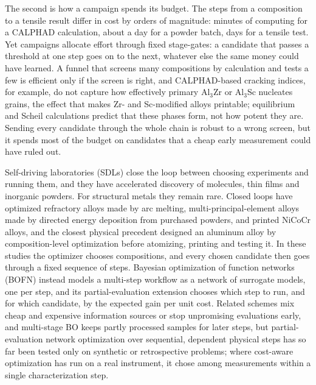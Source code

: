 \documentclass[11pt]{article}
\begin{document}
The second is how a campaign spends its budget. The steps from a composition
to a tensile result differ in cost by orders of magnitude: minutes of computing
for a CALPHAD calculation, about a day for a powder batch, days for a tensile
test. Yet campaigns allocate effort through fixed stage-gates: a candidate that
passes a threshold at one step goes on to the next, whatever else the same
money could have learned. A funnel that screens many
compositions by calculation and tests a few is efficient only if the screen is
right, and CALPHAD-based cracking indices, for example, do not capture how
effectively primary Al$_3$Zr or Al$_3$Sc nucleates grains, the effect that
makes Zr- and Sc-modified alloys printable; equilibrium and Scheil calculations
predict that these phases form, not how potent they are.\cite{kou2015,martin2017,croteau2018} Sending every candidate
through the whole chain is robust to a wrong screen, but it spends most of the
budget on candidates that a cheap early measurement could have ruled out.

Self-driving laboratories (SDLs) close the loop between choosing experiments
and running them, and they have accelerated discovery of molecules, thin films
and inorganic powders.\cite{tom2024,abolhasani2023,stach2021,tobias2025,burger2020,macleod2020,kusne2020,szymanski2023}
For structural metals they remain rare. Closed loops have optimized refractory
alloys made by arc melting,\cite{paramore2025} multi-principal-element alloys
made by directed energy deposition from purchased powders,\cite{nelaturu2024}
and printed NiCoCr alloys,\cite{talbot2026} and the closest physical
precedent designed an aluminum alloy by composition-level optimization before
atomizing, printing and testing it.\cite{taherimousavi2026} In these studies the
optimizer chooses compositions, and every chosen candidate then goes through a
fixed sequence of steps. Bayesian optimization of function
networks (BOFN) instead models a multi-step workflow as a network of surrogate
models, one per step,\cite{astudillo2021} and its partial-evaluation extension
chooses which step to run, and for which candidate, by the expected gain per
unit cost.\cite{buathong2024,buathong2025} Related schemes mix cheap and expensive information sources or stop
unpromising evaluations early,\cite{snoek2012,poloczek2017,swersky2014,li2018hyperband,alvi2026,sabanzagil2025}
and multi-stage BO keeps partly processed samples for later
steps,\cite{torresi2026} but partial-evaluation network optimization over
sequential, dependent physical steps has so far been tested only on synthetic or
retrospective problems; where cost-aware optimization has run on a real
instrument, it chose among measurements within a single characterization
step.\cite{chawla2026}
\end{document}
